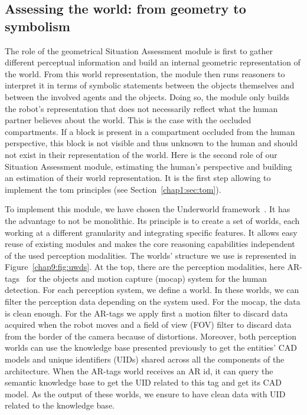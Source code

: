\documentclass[a4paper,11pt,twoside]{StyleThese}
\begin{document}
\subsection{Assessing the world: from geometry to symbolism}

The role of the geometrical Situation Assessment module is first to gather different perceptual information and build an internal geometric representation of the world. From this world representation, the module then runs reasoners to interpret it in terms of symbolic statements between the objects themselves and between the involved agents and the objects. Doing so, the module only builds the robot's representation that does not necessarily reflect what the human partner believes about the world. This is the case with the occluded compartments. If a block is present in a compartment occluded from the human perspective, this block is not visible and thus unknown to the human and should not exist in their representation of the world. Here is the second role of our Situation Assessment module, estimating the human's perspective and building an estimation of their world representation. It is the first step allowing to implement the \acrshort{tom} principles (see Section~\ref{chap1:sec:tom}).

To implement this module, we have chosen the Underworld framework~\cite{lemaignan_2018_underworlds}. It has the advantage to not be monolithic. Its principle is to create a set of worlds, each working at a different granularity and integrating specific features. It allows easy reuse of existing modules and makes the core reasoning capabilities independent of the used perception modalities. The worlds' structure we use is represented in Figure~\ref{chap9:fig:uwds}. At the top, there are the perception modalities, here AR-tags~\cite{fiala_2005_artag} for the objects and motion capture (mocap) system for the human detection. For each perception system, we define a world. In these worlds, we can filter the perception data depending on the system used. For the mocap, the data is clean enough. For the AR-tags we apply first a motion filter to discard data acquired when the robot moves and a field of view (FOV) filter to discard data from the border of the camera because of distortions. Moreover, both perception worlds can use the knowledge base presented previously to get the entities' CAD models and unique identifiers (UIDs) shared across all the components of the architecture. When the AR-tags world receives an AR id, it can query the semantic knowledge base to get the UID related to this tag and get its CAD model. As the output of these worlds, we ensure to have clean data with UID related to the knowledge base.
\end{document}
